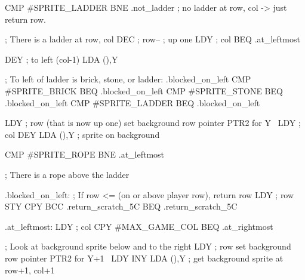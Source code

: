 \documentclass[10pt]{report}
\begin{document}
    CMP     #SPRITE_LADDER
    BNE     .not_ladder     ; no ladder at row, col -> just return row.

    ; There is a ladder at row, col
    DEC          ; row--     ; up one
    LDY          ; col
    BEQ     .at_leftmost

    DEY             ; to left (col-1)
    LDA     (),Y

    ; To left of ladder is brick, stone, or ladder: .blocked_on_left
    CMP     #SPRITE_BRICK
    BEQ     .blocked_on_left
    CMP     #SPRITE_STONE
    BEQ     .blocked_on_left
    CMP     #SPRITE_LADDER
    BEQ     .blocked_on_left

    LDY          ; row (that is now up one)
    \LA{}set background row pointer \code{}PTR2\edoc{} for \code{}Y\edoc{}~{\nwtagstyle{}}\RA{}
    LDY          ; col
    DEY
    LDA     (),Y    ; sprite on background

    CMP     #SPRITE_ROPE
    BNE     .at_leftmost

    ; There is a rope above the ladder

.blocked_on_left:
    ; If row <=  (on or above player row), return row
    LDY          ; row
    STY     
    CPY     
    BCC     .return_scratch_5C
    BEQ     .return_scratch_5C

.at_leftmost:
    LDY          ; col
    CPY     #MAX_GAME_COL
    BEQ     .at_rightmost

    ; Look at background sprite below and to the right
    LDY          ; row
    \LA{}set background row pointer \code{}PTR2\edoc{} for \code{}Y+1\edoc{}~{\nwtagstyle{}}\RA{}
    LDY     
    INY
    LDA     (),Y        ; get background sprite at row+1, col+1
\end{document}
